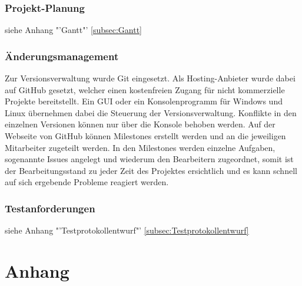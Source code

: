 \subsubsection{Projekt-Planung}
siehe Anhang "'Gantt"' \ref{subsec:Gantt}

\subsubsection{Änderungsmanagement}
Zur Versionsverwaltung wurde Git eingesetzt. Als Hosting-Anbieter wurde dabei auf GitHub gesetzt, welcher einen kostenfreien Zugang für nicht kommerzielle Projekte bereitstellt. Ein \ac{GUI} oder ein Konsolenprogramm für Windows und Linux übernehmen dabei die Steuerung der Versionsverwaltung. Konflikte in den einzelnen Versionen können nur über die Konsole behoben werden. Auf der Webseite von GitHub können Milestones erstellt werden und an die jeweiligen Mitarbeiter zugeteilt werden. In den Milestones werden einzelne Aufgaben, sogenannte Issues angelegt und wiederum den Bearbeitern zugeordnet, somit ist der Bearbeitungsstand zu jeder Zeit des Projektes ersichtlich und es kann schnell auf sich ergebende Probleme reagiert werden.



\subsubsection{Testanforderungen}
siehe Anhang "'Testprotokollentwurf"' \ref{subsec:Testprotokollentwurf}



\section{Anhang}

